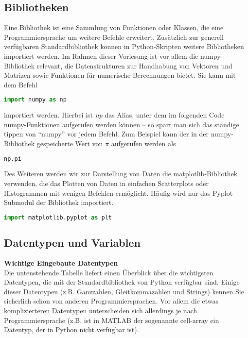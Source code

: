 \subsection{Bibliotheken} 
Eine Bibliothek ist eine Sammlung von Funktionen oder Klassen, die eine Programmiersprache um weitere Befehle erweitert.
Zusätzlich zur generell verfügbaren Standardbibliothek können in Python-Skripten weitere Bibliotheken importiert werden. Im Rahmen dieser Vorlesung ist vor allem die numpy-Bibliothek relevant, die Datenstrukturen zur Handhabung von Vektoren und Matrizen sowie Funktionen für numerische Berechnungen bietet. Sie kann mit dem Befehl
\begin{lstlisting}[language = Python]
import numpy as np
\end{lstlisting}
importiert werden. Hierbei ist \textit{np} das Alias, unter dem im folgenden Code numpy-Funktionen aufgerufen werden können -- so spart man sich das ständige tippen von ``numpy'' vor jedem Befehl. Zum Beispiel kann der in der numpy-Bibliothek gespeicherte Wert von $\pi$ aufgerufen werden als
\begin{lstlisting}[language = Python]
np.pi 
\end{lstlisting}
Des Weiteren werden wir zur Darstellung von Daten die matplotlib-Bibliothek verwenden, die das Plotten von Daten in einfachen Scatterplots oder Histogrammen mit wenigen Befehlen ermöglicht. Häufig wird nur das Pyplot-Submodul der Bibliothek importiert. 
\begin{lstlisting}[language = Python]
import matplotlib.pyplot as plt
\end{lstlisting}  

\subsection{Datentypen und Variablen} 

\textbf{Wichtige Eingebaute Datentypen} \\
Die untenstehende Tabelle liefert einen Überblick über die wichtigsten Datentypen, die mit der Standardbibliothek von Python verfügbar sind. Einige dieser Datentypen (z.B. Ganzzahlen, Gleitkommazahlen und Strings) kennen Sie sicherlich schon von anderen Programmiersprachen. Vor allem die etwas komplizierteren Datentypen unterscheiden sich allerdings je nach Programmiersprache (z.B. ist in MATLAB der sogenannte cell-array ein Datentyp, der in Python nicht verfügbar ist). 

